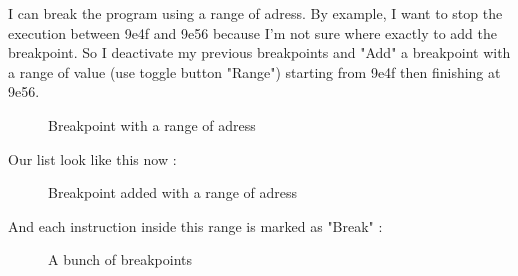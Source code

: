 \documentclass[10pt]{report}
\begin{document}
I can break the program using a range of adress.\newline
By example, I want to stop the execution between 9e4f and 9e56 because I'm not sure where exactly to add the breakpoint.\newline
So I deactivate my previous breakpoints and "Add" a breakpoint with a range of value (use toggle button "Range") starting from 9e4f then finishing at 9e56.\newline

\begin{figure}[H]
\centering
{}
\caption{Breakpoint with a range of adress}
\end{figure}

Our list look like this now :\newline
\begin{figure}[H]
\centering
{}
\caption{Breakpoint added with a range of adress}
\end{figure}

And each instruction inside this range is marked as "Break" :\newline
\begin{figure}[H]
\centering
{}
\caption{A bunch of breakpoints}
\end{figure}
\end{document}
